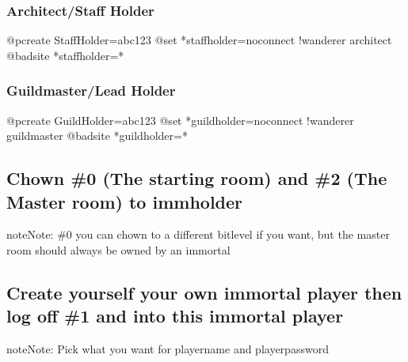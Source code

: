 \documentclass[letterpaper,10pt,english]{sphinxmanual}
\begin{document}
\subsubsection{Architect/Staff Holder}
\label{\detokenize{gettingstarted:architect-staff-holder}}
\begin{sphinxVerbatim}[commandchars=\\\{\}]
@pcreate StaffHolder=abc123
@set *staffholder=no\PYGZus{}connect !wanderer architect
@badsite *staffholder=*
\end{sphinxVerbatim}


\subsubsection{Guildmaster/Lead Holder}
\label{\detokenize{gettingstarted:guildmaster-lead-holder}}
\begin{sphinxVerbatim}[commandchars=\\\{\}]
@pcreate GuildHolder=abc123
@set *guildholder=no\PYGZus{}connect !wanderer guildmaster
@badsite *guildholder=*
\end{sphinxVerbatim}


\subsection{Chown \#0 (The starting room) and \#2 (The Master room) to immholder}
\label{\detokenize{gettingstarted:chown-0-the-starting-room-and-2-the-master-room-to-immholder}}
\begin{sphinxadmonition}{note}{Note:}
\sphinxAtStartPar
\#0 you can chown to a different bitlevel if you want, but the master room should always be owned by an immortal
\end{sphinxadmonition}

\begin{sphinxVerbatim}[commandchars=\\\{\}]
 
 
\end{sphinxVerbatim}


\subsection{Create yourself your own immortal player then log off \#1 and into this immortal player}
\label{\detokenize{gettingstarted:create-yourself-your-own-immortal-player-then-log-off-1-and-into-this-immortal-player}}
\begin{sphinxadmonition}{note}{Note:}
\sphinxAtStartPar
Pick what you want for playername and playerpassword
\end{sphinxadmonition}
\end{document}
